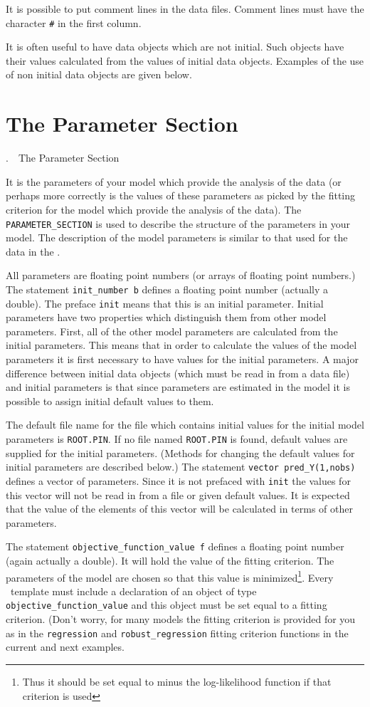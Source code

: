 \documentclass[12pt]{book}
\makeatletter
\def\mysection#1{\section{#1}{\bigbf \medbreak\noindent\number\c@chapter.\number\c@section\ \ #1\medbreak}}
\makeatother
\begin{document}
\noindent It is possible to put comment lines in the data files.
Comment lines must have the character {\tt\#} in the first
column.

It is often useful to have data objects which are not initial.
Such objects have their values calculated from the values of
initial data objects. Examples of the use of non initial data objects
are given below.

\mysection{The Parameter Section}

It is the parameters of your model which
provide the analysis of the data (or perhaps more correctly
is the values of these parameters as picked by the
fitting criterion for the model which provide the
analysis of the data).
The {\tt PARAMETER\_SECTION} is used to describe the structure of the  
parameters in your model.
The description of the model parameters is similar to that used for
the data in the \DS.

All parameters are floating point numbers (or arrays of floating point numbers.)
The \hbox{statement} {\tt init\_number b} defines
a floating point number  (actually a double). The preface {\tt init}
means that this is an initial parameter. Initial parameters have
two properties which distinguish them from other model
parameters. First, all of the other model parameters are calculated from
the initial parameters. This means that in order to calculate the
values of the model parameters it is first necessary to have 
values for the initial parameters. A major difference between
initial data objects (which must be read in from a data file) 
and initial parameters is that since parameters are estimated 
in the model it is possible to assign initial default values to them.

The default file name for the file which contains initial
values for the initial model parameters is
{\tt ROOT.PIN}. If no file named {\tt ROOT.PIN} is found,
default values are supplied for the initial parameters.
(Methods for changing the default values for initial parameters
are described below.)
The statement  {\tt vector pred\_Y(1,nobs)} defines
a vector of parameters. Since it is not prefaced with {\tt init}
the values for this vector will not be read in from a file
or given default values. It is expected that the value of the
elements of this vector will be calculated in terms of
other parameters.

The statement  {\tt objective\_function\_value f} defines a floating 
point number 
(again actually a double). It will hold the
value of the fitting criterion. The parameters of the model are
chosen so that this value is minimized\footnote{Thus it should be set equal to
minus the log-likelihood function if that criterion is used}. 
Every \ADM\ template
must include a declaration of an object of type 
{\tt objective\_function\_value} and  this object must be
set equal to a fitting criterion. (Don't worry, for many
models the
fitting criterion is provided for you as in the {\tt regression}
and {\tt robust\_regression} fitting criterion functions 
in the current and next examples.
\end{document}
